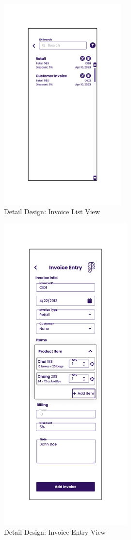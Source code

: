 \documentclass[../thesis.tex]{subfiles}
\begin{document}
\begin{figure}[H]
    \centering
    \includegraphics[width=0.57\textwidth]{images/DetailedDesign_Invoice_List.png}
    \caption{Detail Design: Invoice List View}
    \label{fig:DetailedDesign_Invoice_List}
\end{figure}

\begin{figure}[H]
    \centering
    \label{fig:DetailedDesign_Invoice_Entry}

    \includegraphics[width=0.60\textwidth]{images/DetailedDesign_Invoice_Entry.png}
    \caption{Detail Design: Invoice Entry View}
\end{figure}
\end{document}
